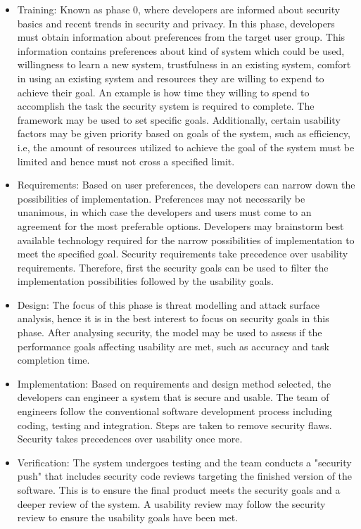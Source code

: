 \begin{itemize}
\item Training: Known as phase 0, where developers are informed about security basics and recent trends in security and privacy. In this phase, developers must obtain information about preferences from the target user group. This information contains preferences about kind of system which could be used, willingness to learn a new system, trustfulness in an existing system, comfort in using an existing system and resources they are willing to expend to achieve their goal. An example is how time they willing to spend to accomplish the task the security system is required to complete. The framework may be used to set specific goals. Additionally, certain usability factors may be given priority based on goals of the system, such as efficiency, i.e, the amount of resources utilized to achieve the goal of the system must be limited and hence must not cross a specified limit.

\item Requirements: Based on user preferences, the developers can narrow down the possibilities of implementation. Preferences may not necessarily be unanimous, in which case the developers and users must come to an agreement for the most preferable options. Developers may brainstorm best available technology required for the narrow possibilities of implementation to meet the specified goal. Security requirements take precedence over usability requirements. Therefore, first the security goals can be used to filter the implementation possibilities followed by the usability goals.

\item Design: The focus of this phase is threat modelling and attack surface analysis, hence it is in the best interest to focus on security goals in this phase. After analysing security, the model may be used to assess if the performance goals affecting usability are met, such as accuracy and task completion time.

\item Implementation: Based on requirements and design method selected, the developers can engineer a system that is secure and usable. The team of engineers follow the conventional software development process including coding, testing and integration.  Steps are taken to remove security flaws. Security takes precedences over usability once more. 

\item Verification: The system undergoes testing and the team conducts a "security push" that includes security code reviews targeting the finished version of the software. This is to ensure the final product meets the security goals and a deeper review of the system. A usability review may follow the security review to ensure the usability goals have been met.


\end{itemize}
